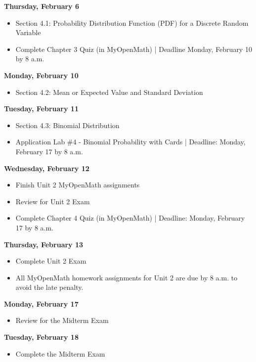 \documentclass[11pt]{article}
\begin{document}
\textbf{Thursday, February 6}

\begin{itemize}
\item Section 4.1: Probability Distribution Function (PDF) for a Discrete Random Variable
\item Complete Chapter 3 Quiz (in MyOpenMath) | Deadline Monday, February 10 by 8 a.m.
\end{itemize}

\textbf{Monday, February 10}

\begin{itemize}
\item Section 4.2: Mean or Expected Value and Standard Deviation
\end{itemize}

\textbf{Tuesday, February 11}

\begin{itemize}
\item Section 4.3: Binomial Distribution
\item Application Lab \#4 - Binomial Probability with Cards | Deadline: Monday, February 17 by 8 a.m.
\end{itemize}

\textbf{Wednesday, February 12}

\begin{itemize}
\item Finish Unit 2 MyOpenMath assignments
\item Review for Unit 2 Exam
\item Complete Chapter 4 Quiz (in MyOpenMath) | Deadline: Monday, February 17 by 8 a.m.
\end{itemize}

\textbf{Thursday, February 13}

\begin{itemize}
\item Complete Unit 2 Exam
\item All MyOpenMath homework assignments for Unit 2 are due by 8 a.m. to avoid the late penalty.
\end{itemize}

\textbf{Monday, February 17}

\begin{itemize}
\item Review for the Midterm Exam
\end{itemize}

\textbf{Tuesday, February 18}

\begin{itemize}
\item Complete the Midterm Exam
\end{itemize}
\end{document}
